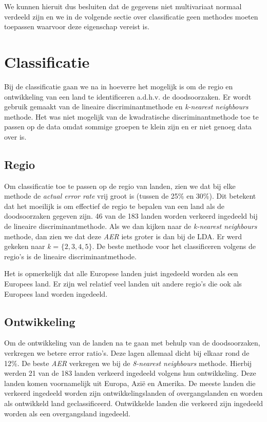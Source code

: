 \documentclass[a4paper,kulak]{kulakarticle}
\begin{document}
We kunnen hieruit dus besluiten dat de gegevens niet multivariaat normaal verdeeld zijn en we in de volgende sectie over classificatie geen methodes moeten toepassen waarvoor deze eigenschap vereist is. %



\section{Classificatie}
Bij de classificatie gaan we na in hoeverre het mogelijk is om de regio en ontwikkeling van een land te identificeren a.d.h.v. de doodsoorzaken. Er wordt gebruik gemaakt van de lineaire discriminantmethode en \textit{k-nearest neighbours} methode. Het was niet mogelijk van de kwadratische discriminantmethode toe te passen op de data omdat sommige groepen te klein zijn en er niet genoeg data over is.

\subsection{Regio} %
Om classificatie toe te passen op de regio van landen, zien we dat bij elke methode de \textit{actual error rate} vrij groot is (tussen de 25\% en 30\%). Dit betekent dat het moeilijk is om effectief de regio te bepalen van een land als de doodsoorzaken gegeven zijn. 46 van de 183 landen worden verkeerd ingedeeld bij de lineaire discriminantmethode. Als we dan kijken naar de \textit{k-nearest neighbours} methode, dan zien we dat deze \textit{AER} iets groter is dan bij de LDA. Er werd gekeken naar \textit{k} = $\{2,3,4,5\}$. De beste methode voor het classificeren volgens de regio's is de lineaire discriminantmethode. 

Het is opmerkelijk dat alle Europese landen juist ingedeeld worden als een Europees land. Er zijn wel relatief veel landen uit andere regio's die ook als Europees land worden ingedeeld. 

\subsection{Ontwikkeling}
Om de ontwikkeling van de landen na te gaan met behulp van de doodsoorzaken, verkregen we betere error ratio's. Deze lagen allemaal dicht bij elkaar rond de 12\%. De beste \textit{AER} verkregen we bij de \textit{8-nearest neighbours} methode. Hierbij werden 21 van de 183 landen verkeerd ingedeeld volgens hun ontwikkeling. Deze landen komen voornamelijk uit Europa, Azi\"e en Amerika. De meeste landen die verkeerd ingedeeld worden zijn ontwikkelingslanden of overgangslanden en worden als ontwikkeld land geclassificeerd. Ontwikkelde landen die verkeerd zijn ingedeeld worden als een overgangsland ingedeeld. 
\end{document}
